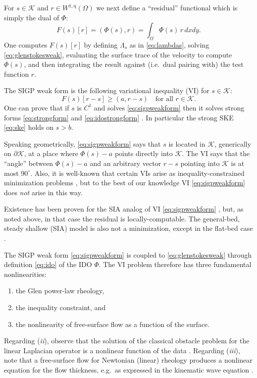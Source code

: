 \documentclass[letterpaper,final,12pt,reqno]{amsart}
\theoremstyle{claim}
\newcommand{\ip}[2]{\left(#1,#2\right)}
\newcommand{\qq}{{\text{q}}}
\numberwithin{equation}{section}
\numberwithin{figure}{section}
\numberwithin{table}{section}
\numberwithin{theorem}{section}
\begin{document}
For $s \in \mathcal{K}$ and $r \in W^{1,\qq}(\Omega)$ we next define a ``residual'' functional which is simply the dual of $\Phi$:
\begin{equation}
F(s)[r] = \ip{\Phi(s)}{r} = \int_\Omega \Phi(s)\, r \,dx dy. \label{eq:sigpfunctional}
\end{equation}
One computes $F(s)[r]$ by defining $\Lambda_s$ as in \eqref{eq:lambdas}, solving \eqref{eq:glenstokesweak}, evaluating the surface trace of the velocity to compute $\Phi(s)$, and then integrating the result against (i.e.~dual pairing with) the test function $r$.

The SIGP weak form is the following variational inequality (VI) \cite{KinderlehrerStampacchia1980} for $s\in\mathcal{K}$:
\begin{equation}
F(s)[r - s] \ge \ip{a}{r-s} \quad \text{for all $r \in \mathcal{K}$.}  \label{eq:sigpweakform}
\end{equation}
One can prove that if $s$ is $C^1$ and solves \eqref{eq:sigpweakform} then it solves strong forms \eqref{eq:strongform} and \eqref{eq:idostrongform} \cite{Bueler2021conservation}.  In particular the strong SKE \eqref{eq:ske} holds on $s>b$.

Speaking geometrically, \eqref{eq:sigpweakform} says that $s$ is located in $\mathcal{K}$, generically on $\partial\mathcal{K}$, at a place where $\Phi(s)-a$ points directly into $\mathcal{K}$.  The VI says that the ``angle'' between $\Phi(s)-a$ and an arbitrary vector $r-s$ pointing into $\mathcal{K}$ is at most $90^\circ$.  Also, it is well-known that certain VIs arise as inequality-constrained minimization problems \cite{GraeserKornhuber2009,KinderlehrerStampacchia1980}, but to the best of our knowledge VI \eqref{eq:sigpweakform} does \emph{not} arise in this way.

Existence has been proven for the SIA analog of VI \eqref{eq:sigpweakform} \cite{JouvetBueler2012}, but, as noted above, in that case the residual is locally-computable.  The general-bed, steady shallow (SIA) model is also not a minimization, except in the flat-bed case \cite{JouvetBueler2012}.

The SIGP weak form \eqref{eq:sigpweakform} is coupled to \eqref{eq:glenstokesweak} through definition \eqref{eq:ido} of the IDO $\Phi$.  The VI problem therefore has three fundamental nonlinearities:
\renewcommand{\labelenumi}{(\emph{\roman{enumi}})}
\begin{enumerate}
\item the Glen power-law rheology,
\item the inequality constraint, and
\item the nonlinearity of free-surface flow as a function of the surface.
\end{enumerate}
Regarding (\emph{ii}), observe that the solution of the classical obstacle problem for the linear Laplacian operator is a nonlinear function of the data \cite{KinderlehrerStampacchia1980}.  Regarding (\emph{iii}), note that a free-surface flow for Newtonian (linear) rheology produces a nonlinear equation for the flow thickness, e.g.~as expressed in the kinematic wave equation \cite{Ockendonetal2003}.
\end{document}
